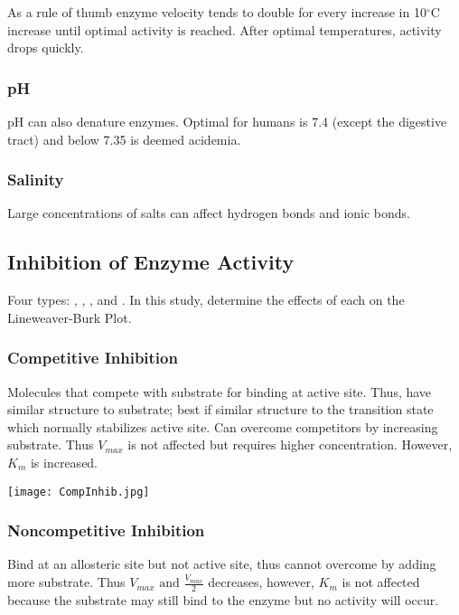 \documentclass[../Bio_chemistryReview.tex]{subfiles}
\begin{document}
As a rule of thumb enzyme velocity tends to double for every increase in 10$
^{\circ} $C increase until optimal activity is reached. After optimal
temperatures, activity drops quickly.

\subsubsection{pH\supdag}

pH can also denature enzymes. Optimal for humans is 7.4 (except the digestive
tract) and below 7.35 is deemed acidemia. 

\subsubsection{Salinity\supdag}

Large concentrations of salts can affect hydrogen bonds and ionic bonds.

\subsection{Inhibition of Enzyme Activity}

Four types: ,  ,  , and . In this study, determine the effects of each on the Lineweaver-Burk
Plot.

\subsubsection{Competitive Inhibition\supddag}

Molecules that compete with substrate for binding at active site. Thus, have
similar structure to substrate; best if similar structure to the transition
state which normally stabilizes active site. Can overcome competitors by
increasing substrate. Thus $ V_{max} $ is not affected but requires higher
concentration. However, $ K_{m} $ is increased.

\begin{center}
  \texttt{[image: CompInhib.jpg]}
\end{center}

\subsubsection{Noncompetitive Inhibition}

Bind at an allosteric site but not active site, thus cannot overcome by adding
more substrate. Thus $ V_{max} \text{ and } \tfrac{V_{max}}{2}$ decreases,
however, $ K_{m} $ is not affected because the substrate may still bind to the
enzyme but no activity will occur.
\end{document}
